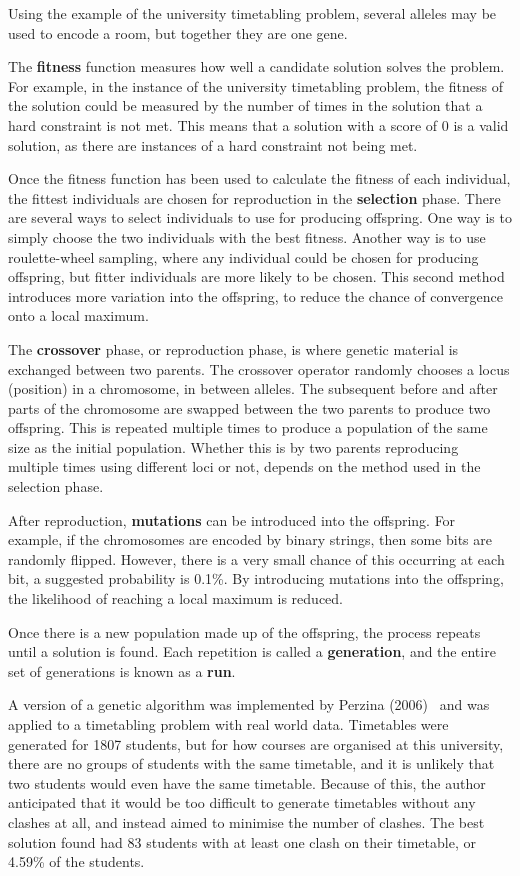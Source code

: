 \documentclass[a4paper, 12pt]{report}
\begin{document}
Using the example of the university timetabling problem, several alleles may be
used to encode a room, but together they are one gene.

The \textbf{fitness} function measures how well a candidate solution solves the
problem.
For example, in the instance of the university timetabling problem, the fitness 
of the solution could be measured by the number of times in the solution that a
hard constraint is not met.
This means that a solution with a score of 0 is a valid solution, as there are
instances of a hard constraint not being met.

Once the fitness function has been used to calculate the fitness of each
individual, the fittest individuals are chosen for reproduction in the
\textbf{selection} phase.
There are several ways to select individuals to use for producing offspring.
One way is to simply choose the two individuals with the best fitness.
Another way is to use roulette-wheel sampling, where any individual could be
chosen for producing offspring, but fitter individuals are more likely to be
chosen.
This second method introduces more variation into the offspring, to reduce the
chance of convergence onto a local maximum.

The \textbf{crossover} phase, or reproduction phase, is where genetic material
is exchanged between two parents.
The crossover operator randomly chooses a locus (position) in a chromosome,
in between alleles.
The subsequent before and after parts of the chromosome are swapped between the
two parents to produce two offspring.
This is repeated multiple times to produce a population of the same size as the
initial population.
Whether this is by two parents reproducing multiple times using different loci
or not, depends on the method used in the selection phase.

After reproduction, \textbf{mutations} can be introduced into the offspring. 
For example, if the chromosomes are encoded by binary strings, then some bits 
are randomly flipped.
However, there is a very small chance of this occurring at each bit, a suggested
probability is 0.1\%.
By introducing mutations into the offspring, the likelihood of reaching a local
maximum is reduced.

Once there is a new population made up of the offspring, the process repeats 
until a solution is found.
Each repetition is called a \textbf{generation}, and the entire set of
generations is known as a \textbf{run}.

A version of a genetic algorithm was implemented by Perzina 
(2006)~\cite{ga_example} and was applied to a timetabling problem with real 
world data.
Timetables were generated for 1807 students, but for how courses are organised 
at this university, there are no groups of students with the same timetable, and
it is unlikely that two students would even have the same timetable.
Because of this, the author anticipated that it would be too difficult to
generate timetables without any clashes at all, and instead aimed to minimise
the number of clashes.
The best solution found had 83 students with at least one clash on their
timetable, or 4.59\% of the students.
\end{document}
